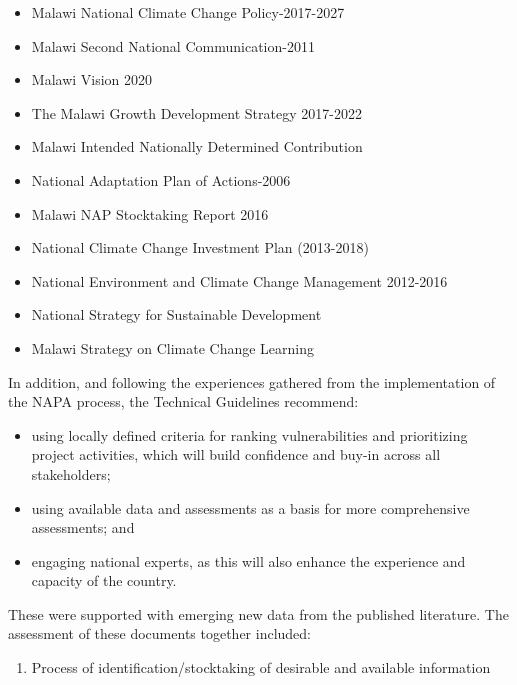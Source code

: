 \documentclass[
]{book}
\providecommand{\tightlist}{%
  \setlength{\itemsep}{0pt}\setlength{\parskip}{0pt}}
\begin{document}
\begin{itemize}
\item
  Malawi National Climate Change Policy-2017-2027
\item
  Malawi Second National Communication-2011
\item
  Malawi Vision 2020
\item
  The Malawi Growth Development Strategy 2017-2022
\item
  Malawi Intended Nationally Determined Contribution
\item
  National Adaptation Plan of Actions-2006
\item
  Malawi NAP Stocktaking Report 2016
\item
  National Climate Change Investment Plan (2013-2018)
\item
  National Environment and Climate Change Management 2012-2016
\item
  National Strategy for Sustainable Development
\item
  Malawi Strategy on Climate Change Learning
\end{itemize}

In addition, and following the experiences gathered from the implementation of the NAPA process, the Technical Guidelines recommend:

\begin{itemize}
\item
  using locally defined criteria for ranking vulnerabilities and prioritizing project activities, which will build confidence and buy-in across all stakeholders;
\item
  using available data and assessments as a basis for more comprehensive assessments; and
\item
  engaging national experts, as this will also enhance the experience and capacity of the country.
\end{itemize}

These were supported with emerging new data from the published literature. The assessment of these documents together included:

\begin{enumerate}
\def\labelenumi{\alph{enumi}.}
\tightlist
\item
  Process of identification/stocktaking of desirable and available information
\end{enumerate}
\end{document}
